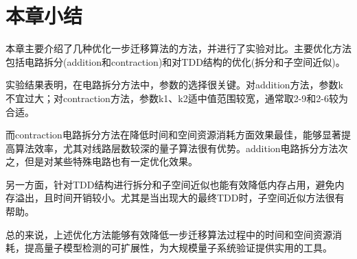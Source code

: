 \section{本章小结}
本章主要介绍了几种优化一步迁移算法的方法，并进行了实验对比。主要优化方法包括电路拆分(addition和contraction)和对TDD结构的优化(拆分和子空间近似)。

实验结果表明，在电路拆分方法中，参数的选择很关键。对addition方法，参数k不宜过大；对contraction方法，参数k1、k2适中值范围较宽，通常取2-9和2-6较为合适。

而contraction电路拆分方法在降低时间和空间资源消耗方面效果最佳，能够显著提高算法效率，尤其对线路层数较深的量子算法很有优势。addition电路拆分方法次之，但是对某些特殊电路也有一定优化效果。

另一方面，针对TDD结构进行拆分和子空间近似也能有效降低内存占用，避免内存溢出，且时间开销较小。尤其是当出现大的最终TDD时，子空间近似方法很有帮助。

总的来说，上述优化方法能够有效降低一步迁移算法过程中的时间和空间资源消耗，提高量子模型检测的可扩展性，为大规模量子系统验证提供实用的工具。